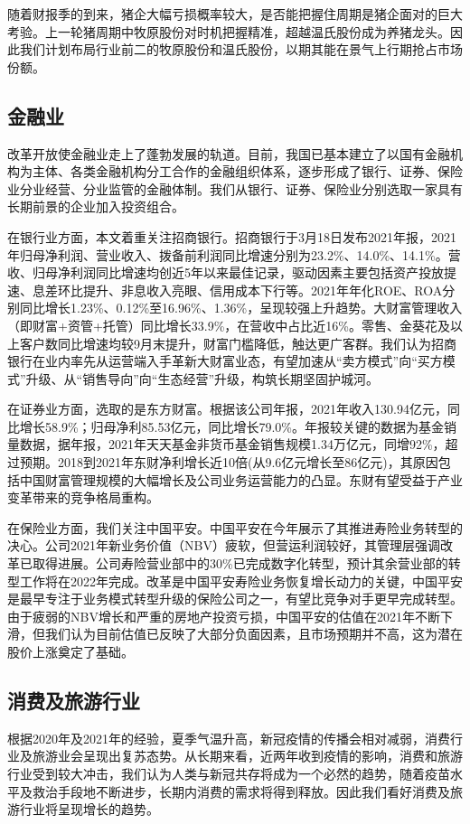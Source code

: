 \documentclass[a4paper,12pt]{ctexart}
\begin{document}
随着财报季的到来，猪企大幅亏损概率较大，是否能把握住周期是猪企面对的巨大考验。上一轮猪周期中牧原股份对时机把握精准，超越温氏股份成为养猪龙头。因此我们计划布局行业前二的牧原股份和温氏股份，以期其能在景气上行期抢占市场份额。
\subsection{金融业}
\label{sec:org87a0558}
改革开放使金融业走上了蓬勃发展的轨道。目前，我国已基本建立了以国有金融机构为主体、各类金融机构分工合作的金融组织体系，逐步形成了银行、证券、保险业分业经营、分业监管的金融体制。我们从银行、证券、保险业分别选取一家具有长期前景的企业加入投资组合。

在银行业方面，本文着重关注招商银行。招商银行于3月18日发布2021年报，2021年归母净利润、营业收入、拨备前利润同比增速分别为23.2\%、14.0\%、14.1\%。营收、归母净利润同比增速均创近5年以来最佳记录，驱动因素主要包括资产投放提速、息差环比提升、非息收入亮眼、信用成本下行等。2021年年化ROE、ROA分别同比增长1.23\%、0.12\%至16.96\%、1.36\%，呈现较强上升趋势。大财富管理收入（即财富+资管+托管）同比增长33.9\%，在营收中占比近16\%。零售、金葵花及以上客户数同比增速均较9月末提升，财富门槛降低，触达更广客群。我们认为招商银行在业内率先从运营端入手革新大财富业态，有望加速从“卖方模式”向“买方模式”升级、从“销售导向”向“生态经营”升级，构筑长期坚固护城河。

在证券业方面，选取的是东方财富。根据该公司年报，2021年收入130.94亿元，同比增长58.9\%；归母净利85.53亿元，同比增长79.0\%。年报较关键的数据为基金销量数据，据年报，2021年天天基金非货币基金销售规模1.34万亿元，同增92\%，超过预期。2018到2021年东财净利增长近10倍(从9.6亿元增长至86亿元)，其原因包括中国财富管理规模的大幅增长及公司业务运营能力的凸显。东财有望受益于产业变革带来的竞争格局重构。

在保险业方面，我们关注中国平安。中国平安在今年展示了其推进寿险业务转型的决心。公司2021年新业务价值（NBV）疲软，但营运利润较好，其管理层强调改革已取得进展。公司寿险营业部中的30\%已完成数字化转型，预计其余营业部的转型工作将在2022年完成。改革是中国平安寿险业务恢复增长动力的关键，中国平安是最早专注于业务模式转型升级的保险公司之一，有望比竞争对手更早完成转型。由于疲弱的NBV增长和严重的房地产投资亏损，中国平安的估值在2021年不断下滑，但我们认为目前估值已反映了大部分负面因素，且市场预期并不高，这为潜在股价上涨奠定了基础。

\subsection{消费及旅游行业}
\label{sec:orgf8c98a9}
根据2020年及2021年的经验，夏季气温升高，新冠疫情的传播会相对减弱，消费行业及旅游业会呈现出复苏态势。从长期来看，近两年收到疫情的影响，消费和旅游行业受到较大冲击，我们认为人类与新冠共存将成为一个必然的趋势，随着疫苗水平及救治手段地不断进步，长期内消费的需求将得到释放。因此我们看好消费及旅游行业将呈现增长的趋势。
\end{document}
